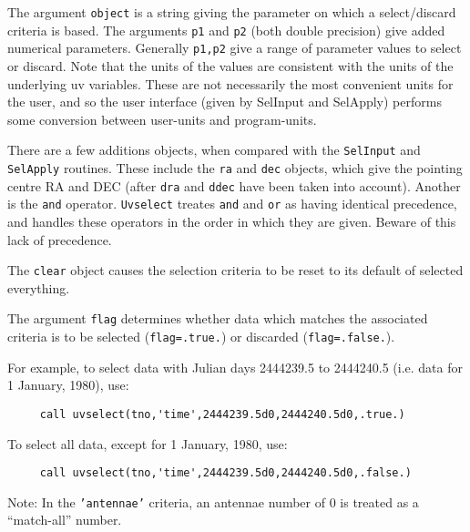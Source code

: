 The argument {\tt object} is a string giving the parameter on which a
select/discard criteria is based. The
arguments {\tt p1} and {\tt p2} (both double precision) give
added numerical parameters. Generally {\tt p1,p2} give a range of
parameter values to select or discard. Note that the units of the values are
consistent with the units of the underlying uv variables. These are not
necessarily the most convenient units for the user, and so the user
interface (given by SelInput and SelApply) performs some conversion
between user-units and program-units.

There are a few additions objects, when compared with the {\tt SelInput}
and {\tt SelApply}
routines. These include the {\tt ra} and {\tt dec} objects, which give the
pointing centre RA and DEC (after {\tt dra} and {\tt ddec} have been taken
into account). Another is the {\tt and} operator. {\tt Uvselect} treates
{\tt and} and {\tt or} as having identical precedence, and handles these
operators in the order in which they are given. Beware of this lack of
precedence.

The {\tt clear} object causes the selection criteria to be reset to its
default of selected everything.

The argument {\tt flag} determines
whether data which matches the associated criteria is to be selected
({\tt flag=.true.}) or discarded ({\tt flag=.false.}).

For example, to select data with Julian days 2444239.5 to 2444240.5 (i.e.
data for 1 January, 1980), use:
\begin{verbatim}
     call uvselect(tno,'time',2444239.5d0,2444240.5d0,.true.)
\end{verbatim}
To select all data, except for 1 January, 1980, use:
\begin{verbatim}
     call uvselect(tno,'time',2444239.5d0,2444240.5d0,.false.)
\end{verbatim}
Note: In the {\tt 'antennae'} criteria, an antennae number of 0 is treated
as a ``match-all'' number.

